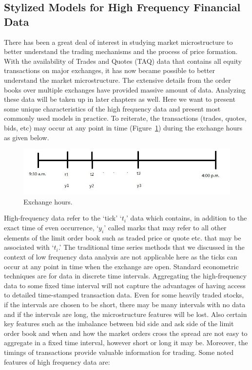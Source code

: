 \subsection{Stylized Models for High Frequency Financial Data}


There has been a great deal of interest in studying market microstructure to better understand the trading mechanisms and the process of price formation. With the availability of Trades and Quotes (TAQ) data that contains all equity transactions on major exchanges, it has now became possible to better understand the market microstructure. The extensive details from the order books over multiple exchanges have provided massive amount of data. Analyzing these data will be taken up in later chapters as well. Here we want to present some unique characteristics of the high frequency data and present most commonly used models in practice. To reiterate, the transactions (trades, quotes, bids, etc) may occur at any point in time (Figure~\ref{fig:exchhours}) during the exchange hours as given below.

	\begin{figure}[!ht]
	\centering
	\includegraphics[width=\textwidth]{chapters/chapter_advanced/figures/33d1.jpg}
	\caption{Exchange hours. \label{fig:exchhours}}
	\end{figure}

High-frequency data refer to the `tick' `$t_i$' data which contains, in addition to the exact time of even occurrence, `$y_i$' called marks that may refer to all other elements of the limit order book such as traded price or quote etc. that may be associated with `$t_i$.' The traditional time series methods that we discussed in the context of low frequency data analysis are not applicable here as the ticks can occur at any point in time when the exchange are open. Standard econometric techniques are for data in discrete time intervals. Aggregating the high-frequency data to some fixed time interval will not capture the advantages of having access to detailed time-stamped transaction data. Even for some heavily traded stocks, if the intervals are chosen to be short, there may be many intervals with no data and if the intervals are long, the microstructure features will be lost. Also certain key features such as the imbalance between bid side and ask side of the limit order book and when and how the market orders cross the spread are not easy to aggregate in a fixed time interval, however short or long it may be. Moreover, the timings of transactions provide valuable information for trading. Some noted features of high frequency data are:


